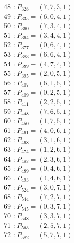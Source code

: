 \documentclass{article}
\begin{document}
{\begin{multicols}{3}
48 : $P_{328}=( 7, 7, 3, 1 )$\\
49 : $P_{335}=( 6, 0, 4, 1 )$\\
50 : $P_{360}=( 7, 3, 4, 1 )$\\
51 : $P_{364}=( 3, 4, 4, 1 )$\\
52 : $P_{377}=( 0, 6, 4, 1 )$\\
53 : $P_{383}=( 6, 6, 4, 1 )$\\
54 : $P_{389}=( 4, 7, 4, 1 )$\\
55 : $P_{395}=( 2, 0, 5, 1 )$\\
56 : $P_{407}=( 6, 1, 5, 1 )$\\
57 : $P_{409}=( 0, 2, 5, 1 )$\\
58 : $P_{411}=( 2, 2, 5, 1 )$\\
59 : $P_{448}=( 7, 6, 5, 1 )$\\
60 : $P_{450}=( 1, 7, 5, 1 )$\\
61 : $P_{461}=( 4, 0, 6, 1 )$\\
62 : $P_{468}=( 3, 1, 6, 1 )$\\
63 : $P_{474}=( 1, 2, 6, 1 )$\\
64 : $P_{483}=( 2, 3, 6, 1 )$\\
65 : $P_{489}=( 0, 4, 6, 1 )$\\
66 : $P_{493}=( 4, 4, 6, 1 )$\\
67 : $P_{524}=( 3, 0, 7, 1 )$\\
68 : $P_{544}=( 7, 2, 7, 1 )$\\
69 : $P_{545}=( 0, 3, 7, 1 )$\\
70 : $P_{548}=( 3, 3, 7, 1 )$\\
71 : $P_{563}=( 2, 5, 7, 1 )$\\
72 : $P_{582}=( 5, 7, 7, 1 )$\\
\end{multicols}


%


%


}%
\end{document}

